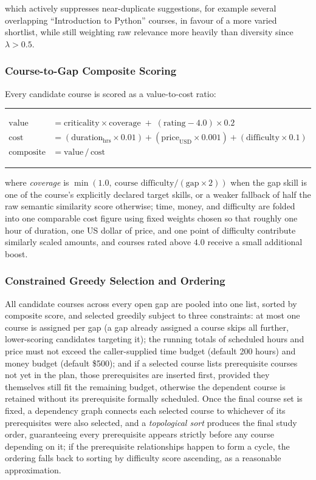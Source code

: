 \documentclass[11pt,a4paper]{article}
\newenvironment{formulabox}
  {\begin{center}\color{TPteal}\rule{0.92\linewidth}{0.8pt}\par\vspace{5pt}\color{TPnavy}}
  {\par\vspace{3pt}\color{TPteal}\rule{0.92\linewidth}{0.8pt}\end{center}}
\begin{document}
which actively suppresses near-duplicate suggestions, for example several overlapping ``Introduction to Python'' courses, in favour of a more varied shortlist, while still weighting raw relevance more heavily than diversity since $\lambda > 0.5$.

\subsubsection{Course-to-Gap Composite Scoring}

Every candidate course is scored as a value-to-cost ratio:

\begin{formulabox}
\begin{align}
\label{eq:composite}
\text{value} &= \text{criticality} \times \text{coverage} \;+\; (\text{rating} - 4.0) \times 0.2 \nonumber \\[2pt]
\text{cost} &= (\text{duration}_{\text{hrs}} \times 0.01) + (\text{price}_{\text{USD}} \times 0.001) + (\text{difficulty} \times 0.1) \nonumber \\[2pt]
\text{composite} &= \text{value} \,/\, \text{cost}
\end{align}
\end{formulabox}

where \emph{coverage} is $\min(1.0,\ \text{course difficulty} / (\text{gap} \times 2))$ when the gap skill is one of the course's explicitly declared target skills, or a weaker fallback of half the raw semantic similarity score otherwise; time, money, and difficulty are folded into one comparable cost figure using fixed weights chosen so that roughly one hour of duration, one US dollar of price, and one point of difficulty contribute similarly scaled amounts, and courses rated above $4.0$ receive a small additional boost.

\subsubsection{Constrained Greedy Selection and Ordering}

All candidate courses across every open gap are pooled into one list, sorted by composite score, and selected greedily subject to three constraints: at most one course is assigned per gap (a gap already assigned a course skips all further, lower-scoring candidates targeting it); the running totals of scheduled hours and price must not exceed the caller-supplied time budget (default 200 hours) and money budget (default \$500); and if a selected course lists prerequisite courses not yet in the plan, those prerequisites are inserted first, provided they themselves still fit the remaining budget, otherwise the dependent course is retained without its prerequisite formally scheduled. Once the final course set is fixed, a dependency graph connects each selected course to whichever of its prerequisites were also selected, and a \emph{topological sort} produces the final study order, guaranteeing every prerequisite appears strictly before any course depending on it; if the prerequisite relationships happen to form a cycle, the ordering falls back to sorting by difficulty score ascending, as a reasonable approximation.
\end{document}
